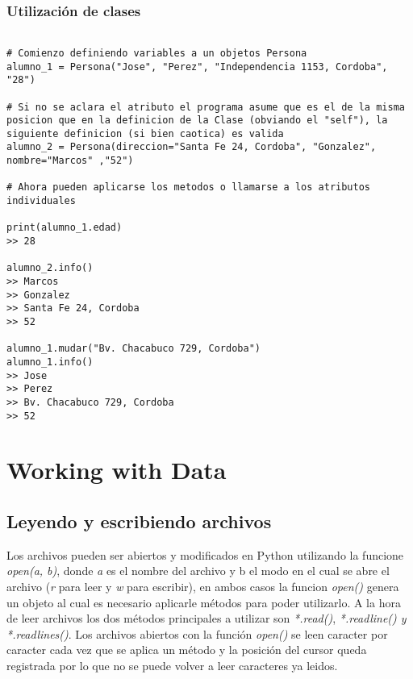 \documentclass[10pt,a4paper]{article}
\begin{document}
\subsubsection{Utilización de clases}
\begin{lstlisting}[caption={Utilización de objetos de una clase, output de consola presentado como $``>>"$}]

# Comienzo definiendo variables a un objetos Persona
alumno_1 = Persona("Jose", "Perez", "Independencia 1153, Cordoba", "28")

# Si no se aclara el atributo el programa asume que es el de la misma posicion que en la definicion de la Clase (obviando el "self"), la siguiente definicion (si bien caotica) es valida
alumno_2 = Persona(direccion="Santa Fe 24, Cordoba", "Gonzalez", nombre="Marcos" ,"52")

# Ahora pueden aplicarse los metodos o llamarse a los atributos individuales

print(alumno_1.edad)
>> 28

alumno_2.info()
>> Marcos
>> Gonzalez
>> Santa Fe 24, Cordoba
>> 52

alumno_1.mudar("Bv. Chacabuco 729, Cordoba")
alumno_1.info()
>> Jose
>> Perez
>> Bv. Chacabuco 729, Cordoba
>> 52
\end{lstlisting}
\section{Working with Data}
\subsection{Leyendo y escribiendo archivos}
Los archivos pueden ser abiertos y modificados en Python utilizando la funcione \emph{open(a, b)}, donde \emph{a} es el nombre del archivo y b el modo en el cual se abre el archivo (\emph{r} para leer y \emph{w} para escribir), en ambos casos la funcion \emph{open()} genera un objeto al cual es necesario aplicarle métodos para poder utilizarlo.
A la hora de leer archivos los dos métodos principales a utilizar son \emph{*.read()}, \emph{*.readline() y \emph{*.readlines()}}. Los archivos abiertos con la función \emph{open()} se leen caracter por caracter cada vez que se aplica un método y la posición del cursor queda registrada por lo que no se puede volver a leer caracteres ya leidos.
\end{document}
